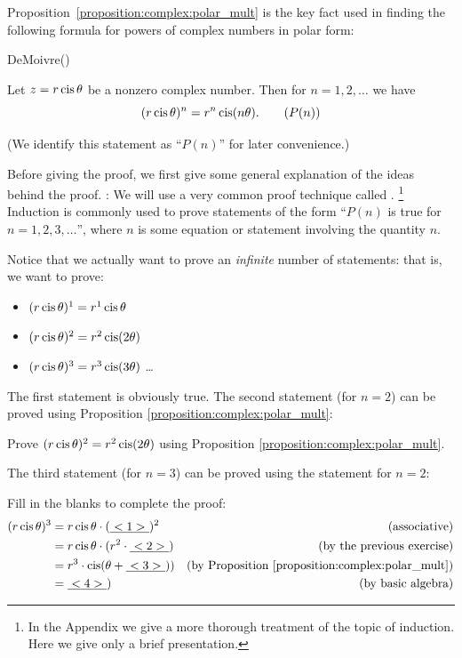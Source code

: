 \noindent
Proposition~\ref{proposition:complex:polar_mult} is the key fact used in finding the following formula for powers of complex numbers in polar form:

\begin{prop}{DeMoivre}() 

Let $z=r\operatorname{cis}\theta$ be a nonzero complex number. Then for $n=1,2,\ldots$ we have
\[ (r\operatorname{cis}\theta)^{n}=r^{n}\operatorname{cis}(n\theta).\tag{$P(n)$}\]
 \end{prop}
(We identify this statement as ``$P(n)$'' for later convenience.)

 Before giving the proof, we first give some general explanation of the ideas behind the proof.
\bigskip
\newline
{}:  We will use a very common proof technique called .
\footnote{In the Appendix we give a more thorough treatment of the topic of induction. Here we give only a brief presentation.}
 Induction is commonly used to prove statements of the form ``$P(n)$ is true for $n = 1,2,3,\ldots$'', where $n$ is some equation or statement involving the quantity $n$. 

Notice that we actually want to prove an \emph{infinite} number of statements: that is, we want to prove:
\begin{itemize}
\item 
$(r\operatorname{cis}\theta)^{1}=r^{1}\operatorname{cis}\theta$
\item
$(r\operatorname{cis}\theta)^{2}=r^{2}\operatorname{cis}(2\theta)$
\item
$(r\operatorname{cis}\theta)^{3}=r^{3}\operatorname{cis}(3\theta)$
\ldots
\end{itemize}

\noindent The first statement is obviously true. The second statement (for $n=2$) can be proved using Proposition
\ref{proposition:complex:polar_mult}:

\begin{exercise}{27} Prove $(r\operatorname{cis}\theta)^{2}=r^{2}\operatorname{cis}(2\theta)$ using Proposition
\ref{proposition:complex:polar_mult}.
\end{exercise}

The third statement (for $n=3$) can be proved using the statement for $n=2$:

\begin{exercise}{28} Fill in the blanks to complete the proof:
\begin{align*}
(r\cis\theta)^{3} &= r\cis\theta \cdot (\underline{~<1>~})^{2} & \text{(associative)} \\
 &=  r\cis\theta \cdot (r^{2} \cdot\underline{~<2>~}) & \text{(by the previous exercise)}\\
 &=  r^{3} \cdot \cis( \theta +  \underline{~<3>~})) & \mbox{(by Proposition \ref{proposition:complex:polar_mult})}\\
 &=   \underline{~<4>~}) & \mbox{(by basic algebra)}\\
\end{align*}
\end{exercise}

